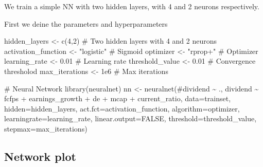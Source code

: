 \documentclass[
  letterpaper,
  DIV=11,
  numbers=noendperiod,
  oneside]{scrartcl}
\newenvironment{Shaded}{\begin{snugshade}}{\end{snugshade}}
\newcommand{\AttributeTok}[1]{\textcolor[rgb]{0.40,0.45,0.13}{#1}}
\newcommand{\CommentTok}[1]{\textcolor[rgb]{0.37,0.37,0.37}{#1}}
\newcommand{\ConstantTok}[1]{\textcolor[rgb]{0.56,0.35,0.01}{#1}}
\newcommand{\DecValTok}[1]{\textcolor[rgb]{0.68,0.00,0.00}{#1}}
\newcommand{\FloatTok}[1]{\textcolor[rgb]{0.68,0.00,0.00}{#1}}
\newcommand{\FunctionTok}[1]{\textcolor[rgb]{0.28,0.35,0.67}{#1}}
\newcommand{\NormalTok}[1]{\textcolor[rgb]{0.00,0.23,0.31}{#1}}
\newcommand{\OtherTok}[1]{\textcolor[rgb]{0.00,0.23,0.31}{#1}}
\newcommand{\SpecialCharTok}[1]{\textcolor[rgb]{0.37,0.37,0.37}{#1}}
\newcommand{\StringTok}[1]{\textcolor[rgb]{0.13,0.47,0.30}{#1}}
\begin{document}
We train a simple NN with two hidden layers, with 4 and 2 neurons
respectively.

First we deine the parameters and hyperparameters

\begin{Shaded}
\begin{Highlighting}[]
\NormalTok{hidden\_layers }\OtherTok{\textless{}{-}} \FunctionTok{c}\NormalTok{(}\DecValTok{4}\NormalTok{,}\DecValTok{2}\NormalTok{)  }\CommentTok{\# Two hidden layers with 4 and 2 neurons}
\NormalTok{activation\_function }\OtherTok{\textless{}{-}} \StringTok{"logistic"}  \CommentTok{\# Sigmoid}
\NormalTok{optimizer }\OtherTok{\textless{}{-}} \StringTok{"rprop+"}  \CommentTok{\# Optimizer}
\NormalTok{learning\_rate }\OtherTok{\textless{}{-}} \FloatTok{0.01}  \CommentTok{\# Learning rate}
\NormalTok{threshold\_value }\OtherTok{\textless{}{-}} \FloatTok{0.01}  \CommentTok{\# Convergence  thresholod }
\NormalTok{max\_iterations }\OtherTok{\textless{}{-}} \FloatTok{1e6}  \CommentTok{\# Max iterations}
\end{Highlighting}
\end{Shaded}

\begin{Shaded}
\begin{Highlighting}[]
\CommentTok{\# Neural Network}
\FunctionTok{library}\NormalTok{(neuralnet)}
\NormalTok{nn }\OtherTok{\textless{}{-}} \FunctionTok{neuralnet}\NormalTok{(}\CommentTok{\#dividend \textasciitilde{} .,}
\NormalTok{                dividend }\SpecialCharTok{\textasciitilde{}}\NormalTok{ fcfps }\SpecialCharTok{+}\NormalTok{ earnings\_growth }\SpecialCharTok{+}\NormalTok{ de }\SpecialCharTok{+}\NormalTok{ mcap }\SpecialCharTok{+}\NormalTok{ current\_ratio, }
                \AttributeTok{data=}\NormalTok{trainset, }
                \AttributeTok{hidden=}\NormalTok{hidden\_layers, }
                \AttributeTok{act.fct=}\NormalTok{activation\_function, }
                \AttributeTok{algorithm=}\NormalTok{optimizer, }
                \AttributeTok{learningrate=}\NormalTok{learning\_rate,}
                \AttributeTok{linear.output=}\ConstantTok{FALSE}\NormalTok{, }
                \AttributeTok{threshold=}\NormalTok{threshold\_value,}
                \AttributeTok{stepmax=}\NormalTok{max\_iterations)}
\end{Highlighting}
\end{Shaded}

\subsection{Network plot}\label{network-plot}
\end{document}
